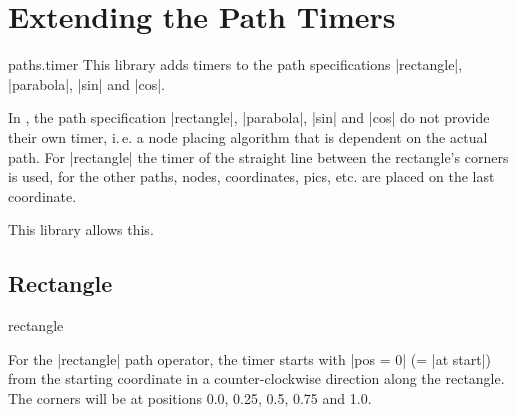 %
%
%
\makeatletter
\newenvironment{pathoperation'}[3][]{
  \begin{pgfmanualentry}
    \def\pgfmanualtest{#1}%
    \pgfmanualentryheadline{%
      \ifx\pgfmanualtest\@empty%
        \pgfmanualpdflabel{#2}{}%
      \fi%
    }%
    \ifx\pgfmanualtest\@empty%
      \index{#2@\protect\texttt{#2} path operation}%
      \index{Path operations!#2@\protect\texttt{#2}}%
    \fi%
    \pgfmanualbody
}
{
  \end{pgfmanualentry}
}
\makeatother
\section{Extending the Path Timers}
\label{library:timer}

\begin{tikzlibrary}{paths.timer}
  This library adds timers to the path specifications |rectangle|, |parabola|, |sin| and |cos|.
\end{tikzlibrary}

In \tikzname, the path specification |rectangle|, |parabola|, |sin| and |cos| do not provide
their own timer, i.\,e. a node placing algorithm that is dependent on the actual path.
For |rectangle| the timer of the straight line between the rectangle's corners is used, for
the other paths, nodes, coordinates, pics, etc. are placed on the last coordinate.

This library allows this.

\subsection{Rectangle}
\begin{pathoperation'}{rectangle}{}\end{pathoperation'}

For the |rectangle| path operator, the timer starts with |pos = 0| (= |at start|) from
the starting coordinate in a counter-clockwise direction along the rectangle.
The corners will be at positions 0.0, 0.25, 0.5, 0.75 and 1.0.

